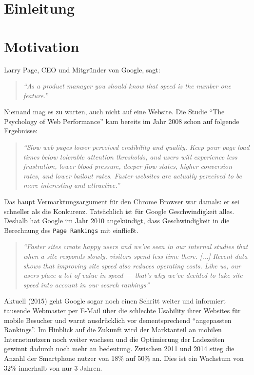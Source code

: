 \section{Einleitung} %
\label{sec:einleitung}



\section{Motivation} %
\label{sub:motivation}

	Larry Page, CEO und Mitgründer von Google, sagt:
	\begin{quote}
		\textit{"`As a product manager you should know that speed is the number one feature."'}\autocite{holzle10}
	\end{quote}
	Niemand mag es zu warten, auch nicht auf eine Website. Die Studie "`The Psychology of Web Performance"' kam bereits im Jahr 2008 schon auf folgende Ergebnisse:

	\begin{quote}\itshape
		"`Slow web pages lower perceived credibility and quality. Keep your page load times below tolerable attention thresholds, and users will experience less frustration, lower blood pressure, deeper flow states, higher conversion rates, and lower bailout rates. Faster websites are actually perceived to be more interesting and attractive."' \autocite{webOpti08}
	\end{quote}

	Das haupt Vermarktungsargument für den Chrome Browser war damals: er sei schneller als die Konkurenz.	Tatsächlich ist für Google Geschwindigkeit alles. Deshalb hat Google im Jahr 2010 angekündigt, dass Geschwindigkeit in die Berechnung des \texttt{Page Rankings} mit einfließt.

	\begin{quote}\itshape
		"`Faster sites create happy users and we've seen in our internal studies that when a site responds slowly, visitors spend less time there. [...] Recent data shows that improving site speed also reduces operating costs. Like us, our users place a lot of value in speed — that's why we've decided to take site speed into account in our search rankings"'\autocite{google10}
	\end{quote}

	Aktuell (2015) geht Google sogar noch einen Schritt weiter und informiert tausende Webmaster per E-Mail über die schlechte Usability ihrer Websites für mobile Besucher und warnt ausdrücklich vor dementsprechend "`angepassten Rankings"'.\autocite{t3n15}
	Im Hinblick auf die Zukunft wird der Marktanteil an mobilen Internetnutzern noch weiter wachsen und die Optimierung der Ladezeiten gewinnt dadurch noch mehr an bedeutung. Zwischen 2011 und 2014 stieg die Anzahl der Smartphone nutzer von 18\% auf 50\% an. Dies ist ein Wachstum von 32\% innerhalb von nur 3 Jahren.\autocite{tns14}\\

